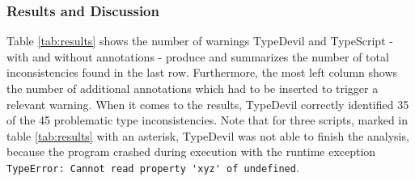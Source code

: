 \documentclass[runningheads,a4paper]{llncs}
\begin{document}
\subsubsection{Results and Discussion}
Table \ref{tab:results} shows the number of warnings TypeDevil and TypeScript - with and without annotations - produce and summarizes the number of total inconsistencies found in the last row.
Furthermore, the most left column shows the number of additional annotations which had to be inserted to trigger a relevant warning.
When it comes to the results, TypeDevil correctly identified 35 of the 45 problematic type inconsistencies.
Note that for three scripts, marked in table \ref{tab:results} with an asterisk, TypeDevil was not able to finish the analysis, because the program crashed during execution with the runtime exception \lstinline[columns=fixed]{TypeError: Cannot read property 'xyz' of undefined}.\\
\end{document}
